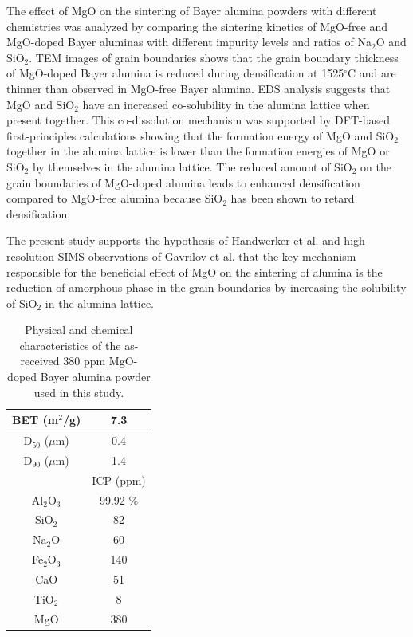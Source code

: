 The effect of MgO on the sintering of Bayer alumina powders with different chemistries was analyzed by comparing the sintering kinetics of MgO-free and MgO-doped Bayer aluminas with different impurity levels and ratios of Na$_{2}$O and SiO$_{2}$. TEM images of grain boundaries shows that the grain boundary thickness of MgO-doped Bayer alumina is reduced during densification at 1525$^{\circ}$C and are thinner than observed in MgO-free Bayer alumina. EDS analysis suggests that MgO and SiO$_{2}$ have an increased co-solubility in the alumina lattice when present together. This co-dissolution mechanism was supported by DFT-based first-principles calculations showing that the formation energy of MgO and SiO$_{2}$ together in the alumina lattice is lower than the formation energies of MgO or SiO$_{2}$ by themselves in the alumina lattice. The reduced amount of SiO$_{2}$ on the grain boundaries of MgO-doped alumina leads to enhanced densification compared to MgO-free alumina because SiO$_{2}$ has been shown to retard densification.

The present study supports the hypothesis of Handwerker et al. \cite{Handwerker1989} and high resolution SIMS observations of Gavrilov et al. \cite{Gavrilov1999} that the key mechanism responsible for the beneficial effect of MgO on the sintering of alumina is the reduction of amorphous phase in the grain boundaries by increasing the solubility of SiO$_{2}$ in the alumina lattice.


\newpage
\begin{table}[H]
	\caption{Physical and chemical characteristics of the as-received 380 ppm MgO-doped Bayer alumina powder used in this study.}
	\centering
	\begin{tabular}{ | c | c | }
			\hline
			BET (m$^{2}$/g) & 7.3 \\
			\hline
			D$_{50}$ ($\mu$m) & 0.4 \\
			\hline
			D$_{90}$ ($\mu$m) & 1.4 \\
			\hline
			 & ICP (ppm) \\
			\hline
			Al$_{2}$O$_{3}$ & 99.92 \% \\
			\hline
			SiO$_{2}$ & 82 \\
			\hline
			Na$_{2}$O & 60 \\
			\hline
			Fe$_{2}$O$_{3}$ & 140 \\
			\hline
			CaO & 51 \\
			\hline
			TiO$_{2}$ & 8 \\
			\hline
			MgO & 380 \\
			\hline
	\end{tabular}
	\label{Ch3-table:table1}
\end{table}
\clearpage

